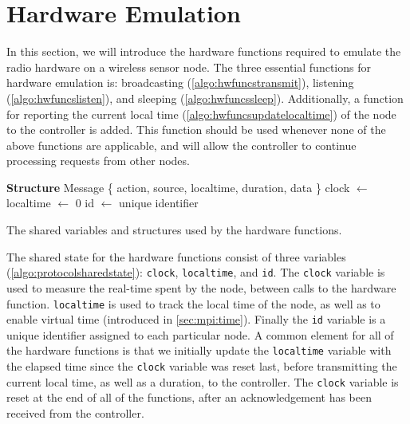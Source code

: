 \section{Hardware Emulation}\label{sec:mpiprotocol}
In this section, we will introduce the hardware functions required to emulate the radio hardware on a wireless sensor node. The three essential functions for hardware emulation is: broadcasting (\autoref{algo:hwfuncstransmit}), listening (\autoref{algo:hwfuncslisten}), and sleeping (\autoref{algo:hwfuncssleep}). Additionally, a function for reporting the current local time (\autoref{algo:hwfuncsupdatelocaltime}) of the node to the controller is added. This function should be used whenever none of the above functions are applicable, and will allow the controller to continue processing requests from other nodes.





\begin{algorithm}[ht]
    \DontPrintSemicolon

    \textbf{Structure} Message \{ action, source, localtime, duration, data \}\;
    \;
    clock $\leftarrow$ \Now\;
    localtime $\leftarrow$ 0\;
    id $\leftarrow$ unique identifier\;
 
    \caption{The shared variables and structures used by the hardware functions.}
    \label{algo:protocolsharedstate}
\end{algorithm}


The shared state for the hardware functions consist of three variables (\autoref{algo:protocolsharedstate}): \texttt{clock}, \texttt{localtime}, and \texttt{id}. The \texttt{clock} variable is used to measure the real-time spent by the node, between calls to the hardware function. \texttt{localtime} is used to track the local time of the node, as well as to enable virtual time (introduced in \autoref{sec:mpi:time}). Finally the \texttt{id} variable is a unique identifier assigned to each particular node. A common element for all of the hardware functions is that we initially update the \texttt{localtime} variable with the elapsed time since the \texttt{clock} variable was reset last, before transmitting the current local time, as well as a duration, to the controller. The \texttt{clock} variable is reset at the end of all of the functions, after an acknowledgement has been received from the controller.\medbreak

